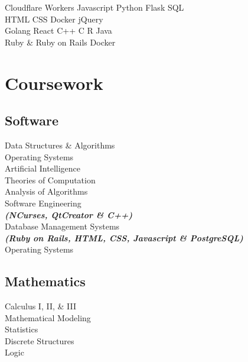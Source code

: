\documentclass[letterpaper]{deedy-resume} %
\begin{document}
\begin{minipage}[t]{0.35\textwidth}
Cloudflare Workers \textbullet{} Javascript \textbullet{} Python \textbullet{} Flask \textbullet{} SQL \\ HTML \textbullet{} CSS \textbullet{} Docker \textbullet{} jQuery \\
Golang \textbullet{} React \textbullet{} C++ \textbullet{} C \textbullet{} R \textbullet{} Java \\ Ruby \& Ruby on Rails \textbullet{} Docker \\

\sectionspace %


\section{Coursework}



\subsection{Software}

Data Structures \& Algorithms \\
Operating Systems \\
Artificial Intelligence \\
Theories of Computation \\
Analysis of Algorithms \\
Software Engineering \\
{\footnotesize \textit{\textbf{(NCurses, QtCreator \& C++) }}} \\
Database Management Systems \\
{\footnotesize \textit{\textbf{(Ruby on Rails, HTML, CSS, Javascript \& PostgreSQL) }}} \\
Operating Systems \\
 
\sectionspace

\subsection{Mathematics}
Calculus I, II, \& III \\
Mathematical Modeling \\
Statistics \\
Discrete Structures \\
Logic \\


\end{minipage}
\end{document}
